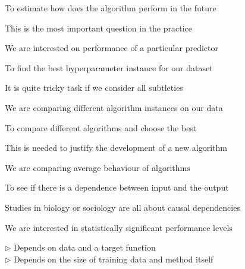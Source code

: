 \documentclass[landscape,footrule]{foils}
\begin{document}
\begin{triangles}
\item To estimate how does the algorithm perform in the future
\begin{diamonds}
\item This is the most important question in the practice 
\item We are interested on performance of a particular predictor\vspace*{2ex} 
\end{diamonds}

\item To find the best hyperparameter instance for our dataset   
\begin{diamonds}
\item It is quite tricky task if we consider all subtleties 
\item We are comparing different algorithm instances on our data\vspace*{2ex}
\end{diamonds}


\item To compare different algorithms and choose the best 
\begin{diamonds}
\item This is needed to justify the development of a new algorithm 
\item We are comparing average behaviour of algorithms\vspace*{2ex} 
\end{diamonds}

\item To see if there is a dependence between input and the output
\begin{diamonds}
\item Studies in biology or sociology are all about causal dependencies
\item We are interested in statistically significant performance levels 
\end{diamonds}

\end{triangles}



\enlargethispage{1cm}
\vspace*{-0.0cm}
$\triangleright$  Depends on data and a target function\\
$\triangleright$  Depends on the size of training data and method itself
\end{document}
